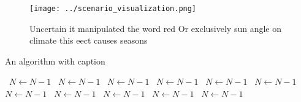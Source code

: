 \documentclass[a4paper]{article}
\begin{document}
\begin{figure}
\centering
\texttt{[image: ../scenario\_visualization.png]}
\caption{Uncertain it manipulated the word red Or exclusively sun angle on climate this eect causes seasons 
}
\end{figure}
 
\begin{algorithm}
\caption{An algorithm with caption}
\begin{algorithmic}
\    \State $N \gets N - 1$
\    \State $N \gets N - 1$
\    \State $N \gets N - 1$
\    \State $N \gets N - 1$
\    \State $N \gets N - 1$
\    \State $N \gets N - 1$
\    \State $N \gets N - 1$
\    \State $N \gets N - 1$
\    \State $N \gets N - 1$
\    \State $N \gets N - 1$
\    \State $N \gets N - 1$
\EndWhile
\end{algorithmic}
\end{algorithm}
\end{document}
